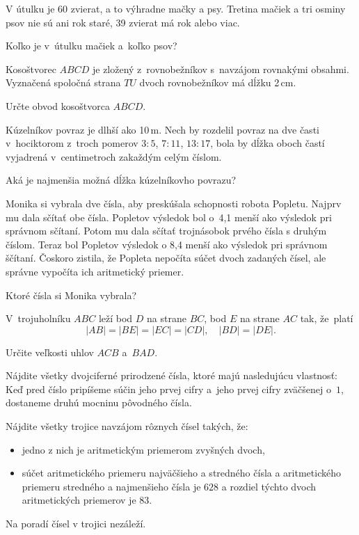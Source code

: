 {%
V útulku je 60 zvierat, a to výhradne mačky a psy. Tretina mačiek a tri osminy psov nie sú ani rok staré, 39 zvierat má rok alebo viac.

Koľko je v~útulku mačiek a~koľko psov?
}

{%
Kosoštvorec $ABCD$ je zložený z~rovnobežníkov s~navzájom rovnakými obsahmi.
Vyznačená spoločná strana $TU$ dvoch rovnobežníkov má dĺžku 2\,cm.

Určte obvod kosoštvorca $ABCD$.
%
}

{%
Kúzelníkov povraz je dlhší ako 10\,m. Nech by rozdelil povraz na dve časti v~hociktorom z~troch pomerov $3:5$, $7:11$, $13:17$, bola by dĺžka oboch častí vyjadrená v~centimetroch zakaždým celým číslom.

Aká je najmenšia možná dĺžka kúzelníkovho povrazu?
}

{%
Monika si vybrala dve čísla, aby preskúšala schopnosti robota Popletu. Najprv mu dala sčítať obe čísla. Popletov výsledok bol o~4,1 menší ako výsledok pri správnom sčítaní.
Potom mu dala sčítať trojnásobok prvého čísla s druhým číslom. Teraz bol Popletov výsledok o 8,4 menší ako výsledok pri správnom ščítaní.
Čoskoro zistila, že Popleta nepočíta súčet dvoch zadaných čísel, ale správne vypočíta ich aritmetický priemer.

Ktoré čísla si Monika vybrala?
}

{%
V~trojuholníku $ABC$ leží bod $D$ na strane $BC$, bod $E$ na strane $AC$ tak, že~platí
$$
|AB| = |BE| = |EC| = |CD|, \quad |BD| = |DE|.
$$

Určite veľkosti uhlov $ACB$ a~$BAD$.
}

{%
Nájdite všetky dvojciferné prirodzené čísla, ktoré majú nasledujúcu vlastnosť:
Keď pred číslo pripíšeme súčin jeho prvej cifry a~jeho prvej cifry zväčšenej o~$1$, dostaneme druhú mocninu pôvodného čísla.
}

{%
Nájdite všetky trojice navzájom rôznych čísel takých, že:
\begin{itemize}
\item jedno z nich je aritmetickým priemerom zvyšných dvoch,
\item súčet aritmetického priemeru najväčšieho a stredného čísla a aritmetického priemeru stredného a najmenšieho čísla je $628$ a rozdiel týchto dvoch aritmetických priemerov je $83$.
\end{itemize}
Na poradí čísel v trojici nezáleží.
}

